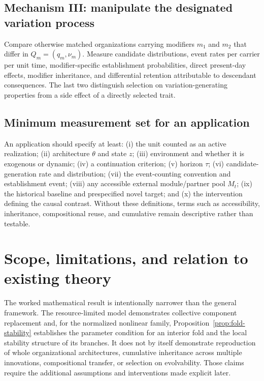 \documentclass[11pt,a4paper]{article}
\begin{document}
\subsection{Mechanism III: manipulate the designated variation process}

Compare otherwise matched organizations carrying modifiers $m_1$ and $m_2$ that differ in $Q_m=(q_m,\nu_m)$. Measure candidate distributions, event rates per carrier per unit time, modifier-specific establishment probabilities, direct present-day effects, modifier inheritance, and differential retention attributable to descendant consequences. The last two distinguish selection on variation-generating properties from a side effect of a directly selected trait.

\subsection{Minimum measurement set for an application}

An application should specify at least: (i) the unit counted as an active realization; (ii) architecture $\theta$ and state $z$; (iii) environment and whether it is exogenous or dynamic; (iv) a continuation criterion; (v) horizon $\tau$; (vi) candidate-generation rate and distribution; (vii) the event-counting convention and establishment event; (viii) any accessible external module/partner pool $M_t$; (ix) the historical baseline and prespecified novel target; and (x) the intervention defining the causal contrast. Without these definitions, terms such as accessibility, inheritance, compositional reuse, and cumulative remain descriptive rather than testable.

\section{Scope, limitations, and relation to existing theory}

The worked mathematical result is intentionally narrower than the general framework. The resource-limited model demonstrates collective component replacement and, for the normalized nonlinear family, Proposition~\ref{prop:fold-stability} establishes the parameter condition for an interior fold and the local stability structure of its branches. It does not by itself demonstrate reproduction of whole organizational architectures, cumulative inheritance across multiple innovations, compositional transfer, or selection on evolvability. Those claims require the additional assumptions and interventions made explicit later.
\end{document}
